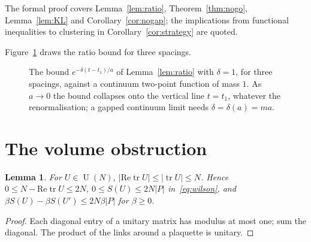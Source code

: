 \documentclass[aps,prd,twocolumn,superscriptaddress,nofootinbib,floatfix]{revtex4-2}
\newtheorem{lemma}[theorem]{Lemma}
\theoremstyle{definition}
\theoremstyle{remark}
\DeclareMathOperator{\U}{U}
\DeclareMathOperator{\Tr}{tr}
\begin{document}
The formal proof covers Lemma~\ref{lem:ratio}, Theorem~\ref{thm:nogo},
Lemma~\ref{lem:KL} and Corollary~\ref{cor:nogap}; the implications from
functional inequalities to clustering in Corollary~\ref{cor:strategy} are
quoted.

Figure~\ref{fig:ratio} draws the ratio bound for three spacings.

\begin{figure}[t]
\centering
{}
\caption{The bound $e^{-\delta(t-t_1)/a}$ of Lemma~\ref{lem:ratio} with
$\delta=1$, for three spacings, against a continuum two-point function of
mass $1$. As $a\to0$ the bound collapses onto the vertical line $t=t_1$,
whatever the renormalisation; a gapped continuum limit needs
$\delta=\delta(a)=ma$.}
\label{fig:ratio}
\end{figure}

\section{The volume obstruction}
\label{sec:volume}

\begin{lemma}
\label{lem:trace}
For $U\in\U(N)$, $|\mathrm{Re}\Tr U|\le|\Tr U|\le N$. Hence
$0\le N-\mathrm{Re}\Tr U\le2N$, $0\le S(U)\le2N|P|$ in~\eqref{eq:wilson},
and $\beta S(U)-\beta S(U')\le2N\beta|P|$ for $\beta\ge0$.
\end{lemma}

\begin{proof}
Each diagonal entry of a unitary matrix has modulus at most one; sum the
diagonal. The product of the links around a plaquette is unitary.
\end{proof}
\end{document}
